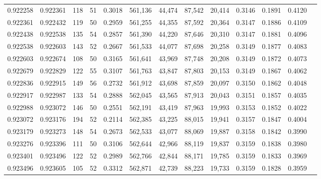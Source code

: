\begin{tabular}{rrrrrrrrrrrrr}
0.922258 & 0.922361 &   118 &  51 &                                     0.3018 & 561,136 &  44,474 &  87,542 &  20,414 & 0.3146 & 0.1891 & 0.4120 \\
0.922361 & 0.922432 &   119 &  50 &                                     0.2959 & 561,255 &  44,355 &  87,592 &  20,364 & 0.3147 & 0.1886 & 0.4109 \\
0.922438 & 0.922538 &   135 &  54 &                                     0.2857 & 561,390 &  44,220 &  87,646 &  20,310 & 0.3147 & 0.1881 & 0.4096 \\
0.922538 & 0.922603 &   143 &  52 &                                     0.2667 & 561,533 &  44,077 &  87,698 &  20,258 & 0.3149 & 0.1877 & 0.4083 \\
0.922603 & 0.922674 &   108 &  50 &                                     0.3165 & 561,641 &  43,969 &  87,748 &  20,208 & 0.3149 & 0.1872 & 0.4073 \\
0.922679 & 0.922829 &   122 &  55 &                                     0.3107 & 561,763 &  43,847 &  87,803 &  20,153 & 0.3149 & 0.1867 & 0.4062 \\
0.922836 & 0.922915 &   149 &  56 &                                     0.2732 & 561,912 &  43,698 &  87,859 &  20,097 & 0.3150 & 0.1862 & 0.4048 \\
0.922917 & 0.922987 &   133 &  54 &                                     0.2888 & 562,045 &  43,565 &  87,913 &  20,043 & 0.3151 & 0.1857 & 0.4035 \\
0.922988 & 0.923072 &   146 &  50 &                                     0.2551 & 562,191 &  43,419 &  87,963 &  19,993 & 0.3153 & 0.1852 & 0.4022 \\
0.923072 & 0.923176 &   194 &  52 &                                     0.2114 & 562,385 &  43,225 &  88,015 &  19,941 & 0.3157 & 0.1847 & 0.4004 \\
0.923179 & 0.923273 &   148 &  54 &                                     0.2673 & 562,533 &  43,077 &  88,069 &  19,887 & 0.3158 & 0.1842 & 0.3990 \\
0.923276 & 0.923396 &   111 &  50 &                                     0.3106 & 562,644 &  42,966 &  88,119 &  19,837 & 0.3159 & 0.1838 & 0.3980 \\
0.923401 & 0.923496 &   122 &  52 &                                     0.2989 & 562,766 &  42,844 &  88,171 &  19,785 & 0.3159 & 0.1833 & 0.3969 \\
0.923496 & 0.923605 &   105 &  52 &                                     0.3312 & 562,871 &  42,739 &  88,223 &  19,733 & 0.3159 & 0.1828 & 0.3959 \\

\end{tabular}
